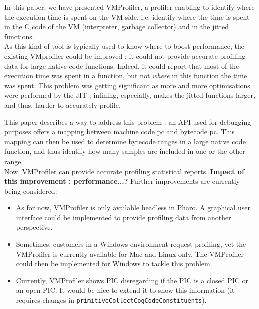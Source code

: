\documentclass[10pt,preprint,nonatbib]{sigplanconf}
\newcommand{\ct}{\lstinline[backgroundcolor=\color{white},basicstyle=\small\ttfamily]}
\newcommand{\myparagraph}[1]{\vspace{0.1cm}\noindent \textbf{\textit{#1.}}}
\begin{document}
In this paper, we have presented VMProfiler, a profiler enabling to identify where the execution time is spent on the VM side, i.e. identify where the time is spent in the C code of the VM (interpreter, garbage collector) and in the jitted functions.\\

As this kind of tool is typically used to know where to boost performance, the existing VMprofiler could be improved : it could not provide accurate profiling data for large native code functions. Indeed, it could report that most of the execution time was spent in a function, but not \textit{where} in this function the time was spent.
This problem was getting significant as more and more optimisations were performed by the JIT ; inlining, especially, makes the jitted functions larger, and thus, harder to accurately profile.

This paper describes a way to address this problem : an API used for debugging purposes offers a mapping between machine code pc and bytecode pc. This mapping can then be used to determine bytecode ranges in a large native code function, and thus identify how many samples are included in one or the other range.\\

Now, VMProfiler can provide accurate profiling statistical reports.
\textbf{Impact of this improvement : performance...?}
Further improvements are currently being considered: 
\begin{itemize}
	\item As for now, VMProfiler is only available headless in Pharo. A graphical user interface could be implemented to provide profiling data from another perspective.
	\item Sometimes, customers in a Windows environment request profiling, yet the VMProfiler is currently available for Mac and Linux only. The VMProfiler could then be implemented for Windows to tackle this problem.
	\item Currently, VMProfiler shows PIC disregarding if the PIC is a closed PIC or an open PIC. It would be nice to extend it to show this information (it requires changes in \ct{primitiveCollectCogCodeConstituents}).
\end{itemize}





%


\end{document}
